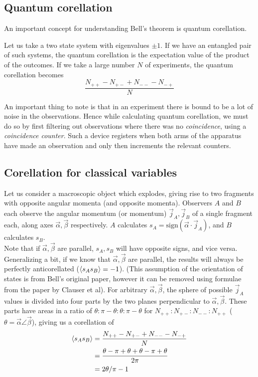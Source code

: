 \documentclass[10pt, twocolumn]{article}
\begin{document}
\subsection{Quantum corellation}
An important concept for understanding Bell's theorem is quantum corellation.

Let us take a two state system with eigenvalues $\pm 1$. If we have an entangled pair of such systems, the quantum corellation is the expectation value of the product of the outcomes. If we take a large number $N$ of experiments, the quantum corellation becomes 
$$\frac{N_{++}-N_{+-}+N_{--}-N_{-+}}{N}$$

An important thing to note is that in an experiment there is bound to be a lot of noise in the observations. Hence while calculating quantum corellation, we must do so by first filtering out observations where there was no \textsl{coincidence}, using a \textsl{coincidence counter}. Such a device registers when both arms of the apparatus have made an observation and only then increments the relevant counters.

\subsection{Corellation for classical variables}
Let us consider a macroscopic object which explodes, giving rise to two fragments with opposite angular momenta (and opposite momenta). Observers $A$ and $B$ each observe the angular momentum (or momentum) $\vec j_A, \vec j_B$ of a single fragment each, along axes $\vec\alpha, \vec\beta$ respectively. $A$ calculates $s_A = \mathrm{sign}(\vec \alpha\cdot\vec j_A)$, and $B$ calculates $s_B$.\\

Note that if $\vec\alpha,\vec\beta$ are parallel, $s_A,s_B$ will have opposite signs, and vice versa. Generalizing a bit, if we know that $\vec\alpha,\vec\beta$ are parallel, the results will always be perfectly anticorellated ($\Braket{s_As_B}=-1$). (This assumption of the orientation of states is from Bell's original paper\cite{bell}, however it can be removed using formulae from the paper by Clauser et al\cite{chsh}). For arbitrary $\vec\alpha,\vec\beta$, the sphere of possible $\vec j_A$ values is divided into four parts by the two planes perpendicular to $\vec\alpha,\vec\beta$. These parts have areas in a ratio of $\theta:\pi-\theta:\theta:\pi-\theta$ for $N_{++}:N_{+-}:N_{--}:N_{++}$ ($\theta = \vec \alpha\angle\vec\beta$), giving us a corellation of 
\begin{align*}
\Braket{s_As_B} &= \frac{N_{++}-N_{+-}+N_{--}-N_{-+}}{N}\\
&= \frac{\theta-\pi+\theta+\theta -\pi +\theta}{2\pi}\\
&= 2\theta/\pi - 1
\end{align*}
\end{document}
